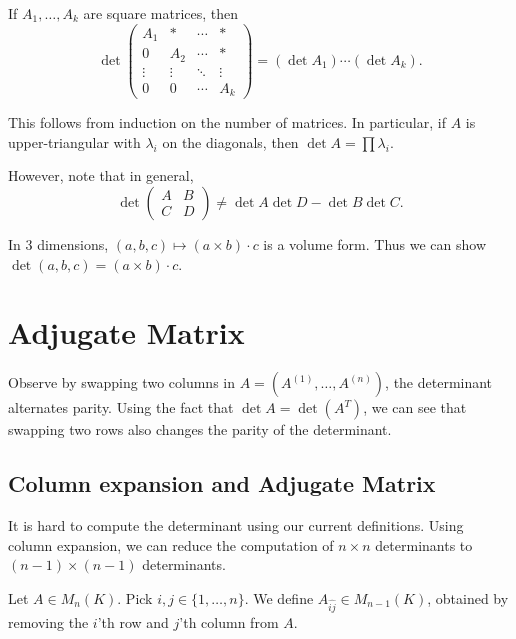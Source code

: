 \documentclass[12pt]{article}
\begin{document}
\begin{corollary}
	If $A_1, \ldots, A_k$ are square matrices, then
	\[
		\det
	\begin{pmatrix}
		A_1 & \ast & \cdots & \ast \\
		0 & A_2 & \cdots & \ast \\
		 \vdots & \vdots& \ddots & \vdots \\
		 0 & 0 & \cdots & A_k
	\end{pmatrix}
	= (\det A_1) \cdots (\det A_k)
	.\]
\end{corollary}
This follows from induction on the number of matrices. In particular, if $A$ is upper-triangular with $\lambda_i$ on the diagonals, then $\det A = \prod \lambda_i$.

However, note that in general,
\[
\det
\begin{pmatrix}
	A & B \\
	C & D
\end{pmatrix}
\neq \det A \det D - \det B \det C
.\]

\begin{remark}
	In 3 dimensions, $(a, b, c) \mapsto (a \times b) \cdot c$ is a volume form. Thus we can show $\det(a, b, c) = (a \times b) \cdot c$.
\end{remark}

\newpage

\section{Adjugate Matrix}%
\label{sec:adjugate_matrix}

Observe by swapping two columns in $A = (A^{(1)}, \ldots, A^{(n)})$, the determinant alternates parity. Using the fact that $\det A = \det (A^{T})$, we can see that swapping two rows also changes the parity of the determinant.

\subsection{Column expansion and Adjugate Matrix}%
\label{sub:column_expansion_and_adjugate_matrix}

It is hard to compute the determinant using our current definitions. Using column expansion, we can reduce the computation of $n \times n$ determinants to $(n-1) \times (n-1)$ determinants.

\begin{definition}
	Let $A \in M_n(K)$. Pick $i, j \in \{1, \ldots, n\}$. We define $A_{\widehat{ij}} \in M_{n-1}(K)$, obtained by removing the $i$'th row and $j$'th column from $A$.
\end{definition}
\end{document}
